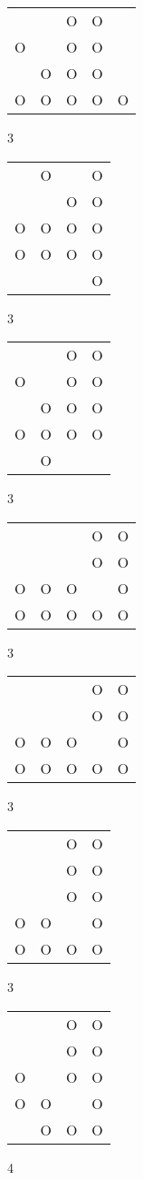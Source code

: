 \begin{tabular}{|m{0.2cm}m{0.2cm}m{0.2cm}m{0.2cm}m{0.2cm}|}\hline
 & &O&O& \\
O& &O&O& \\
 &O&O&O& \\
O&O&O&O&O\\
\hline\end{tabular}3
\begin{tabular}{|m{0.2cm}m{0.2cm}m{0.2cm}m{0.2cm}|}\hline
 &O& &O\\
 & &O&O\\
O&O&O&O\\
O&O&O&O\\
 & & &O\\
\hline\end{tabular}3
\begin{tabular}{|m{0.2cm}m{0.2cm}m{0.2cm}m{0.2cm}|}\hline
 & &O&O\\
O& &O&O\\
 &O&O&O\\
O&O&O&O\\
 &O& & \\
\hline\end{tabular}3
\begin{tabular}{|m{0.2cm}m{0.2cm}m{0.2cm}m{0.2cm}m{0.2cm}|}\hline
 & & &O&O\\
 & & &O&O\\
O&O&O& &O\\
O&O&O&O&O\\
\hline\end{tabular}3
\begin{tabular}{|m{0.2cm}m{0.2cm}m{0.2cm}m{0.2cm}m{0.2cm}|}\hline
 & & &O&O\\
 & & &O&O\\
O&O&O& &O\\
O&O&O&O&O\\
\hline\end{tabular}3
\begin{tabular}{|m{0.2cm}m{0.2cm}m{0.2cm}m{0.2cm}|}\hline
 & &O&O\\
 & &O&O\\
 & &O&O\\
O&O& &O\\
O&O&O&O\\
\hline\end{tabular}3
\begin{tabular}{|m{0.2cm}m{0.2cm}m{0.2cm}m{0.2cm}|}\hline
 & &O&O\\
 & &O&O\\
O& &O&O\\
O&O& &O\\
 &O&O&O\\
\hline\end{tabular}4
